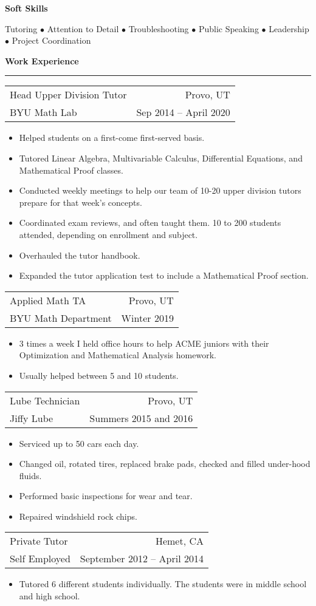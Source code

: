 \documentclass{article}
\newenvironment{compactItemize}{
  \begin{itemize}[itemsep=0ex, parsep=0ex, partopsep=0ex, topsep= -7pt]
}{
  \end{itemize}
}
\newcommand{\jobInfo}[4]{
  \begingroup
  \setlength{\tabcolsep}{0ex}
  \begin{tabularx}{\linewidth}{X r}
    #1 & %
    #2\\ %
    #3 & %
    #4   %
  \end{tabularx}%
  \endgroup%
}
\begin{document}
\textbf{Soft Skills}
  \begin{center}
  Tutoring $\bullet$ Attention to Detail $\bullet$ Troubleshooting $\bullet$ Public Speaking $\bullet$ Leadership $\bullet$ Project Coordination
  \end{center}

\textbf{Work Experience}
\smallskip
\hrule

\jobInfo{Head Upper Division Tutor}{Provo, UT}{BYU Math Lab}{Sep 2014 -- April 2020}
\begin{compactItemize}
  \item Helped students on a first-come first-served basis.
  \item Tutored Linear Algebra, Multivariable Calculus, Differential Equations, and Mathematical Proof classes.
  \item Conducted weekly meetings to help our team of 10-20 upper division tutors prepare for that week's concepts.
  \item Coordinated exam reviews, and often taught them.  10 to 200 students attended, depending on enrollment and subject.
  \item Overhauled the tutor handbook.
  \item Expanded the tutor application test to include a Mathematical Proof section.
\end{compactItemize}
\medskip

\jobInfo{Applied Math TA}{Provo, UT}{BYU Math Department}{Winter 2019}
\begin{compactItemize}
  \item 3 times a week I held office hours to help ACME juniors with their Optimization and Mathematical Analysis homework.
  \item Usually helped between 5 and 10 students.
\end{compactItemize}
\medskip

\jobInfo{Lube Technician}{Provo, UT}{Jiffy Lube}{Summers 2015 and 2016}
\begin{compactItemize}
  \item Serviced up to 50 cars each day.
  \item Changed oil, rotated tires, replaced brake pads, checked and filled under-hood fluids.
  \item Performed basic inspections for wear and tear.
  \item Repaired windshield rock chips.
\end{compactItemize}
\medskip

\jobInfo{Private Tutor}{Hemet, CA}{Self Employed}{September 2012 -- April 2014}
\begin{compactItemize}
  \item Tutored 6 different students individually.  The students were in middle school and high school. 
\end{compactItemize}
\medskip
\end{document}
